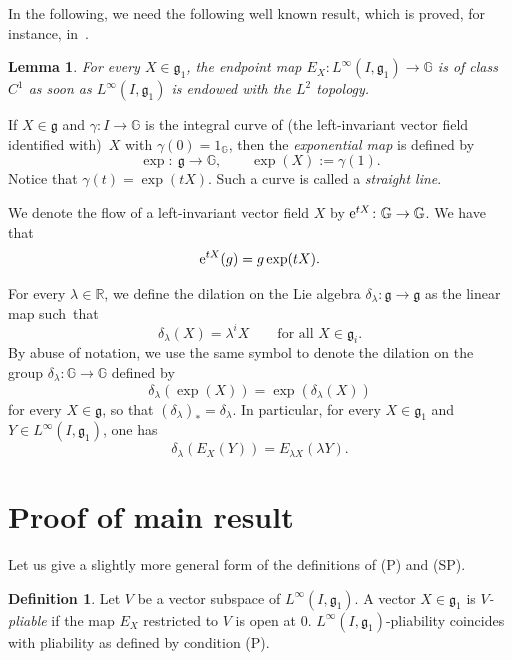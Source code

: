 \documentclass[10pt,a4paper]{amsart}
\numberwithin{equation}{section}
\newtheorem{Lemma}[Theorem]{Lemma}
\theoremstyle{definition}
\newtheorem{Definition}[Theorem]{Definition}
\begin{document}
In the following, we need the following well known result, which is proved, for instance, in~\cite[Section~8]{ABB20}.

\begin{Lemma}
 For every $X\in{\mathfrak g}_1$, the endpoint map $E_X\colon L^\infty(I,{\mathfrak g}_1)\to\mathbb{G}$ is of class $C^1$ as soon as $L^\infty(I,{\mathfrak g}_1)$ is endowed with the $L^2$ topology.
\end{Lemma}

If $X\in{\mathfrak g}$ and $\gamma\colon I \to\mathbb{G}$ is the integral curve of (the left-invariant vector field identified with)~$X$ with $\gamma(0)=1_\mathbb{G}$, then the {\em exponential map} is defined by
\begin{equation*}
 \exp\colon\ {\mathfrak g}\to\mathbb{G}, \qquad \exp(X):=\gamma(1).
\end{equation*}
Notice that $\gamma(t)=\exp(tX)$. Such a curve is called a {\em straight line}.

We denote the flow of a left-invariant vector field $X$ by ${\rm e}^{tX}\colon \mathbb{G}\to\mathbb{G}$. We have that
\[
{\rm e}^{tX}(g)=g\exp(tX).
\]

For every $\lambda\in\mathbb{R}$, we define the dilation on the Lie algebra $\delta_\lambda\colon {\mathfrak g}\to{\mathfrak g}$ as the linear map such~that
\[
 \delta_\lambda(X)=\lambda^i X \qquad \text{for all } X\in{\mathfrak g}_i.
\]
By abuse of notation, we use the same symbol to denote the dilation on the group $\delta_\lambda\colon \mathbb{G} \to \mathbb{G}$ defined by
\begin{equation}\label{eq:dilations-flow}
\delta_\lambda (\exp(X)) = \exp (\delta_\lambda(X))
\end{equation}
for every $X \in {\mathfrak g}$, so that $(\delta_\lambda)_* = \delta_\lambda$. In particular,
for
every $X \in {\mathfrak g}_1$ and $Y \in L^\infty(I,{\mathfrak g}_1)$, one has
\begin{equation}
\label{eq:dilations-flow2}
\delta_\lambda (E_X(Y)) = E_{\lambda X} (\lambda Y).
\end{equation}

\section{Proof of main result}\label{sec:proof}

Let us give a slightly more general form of the definitions of (P) and (SP).

\begin{Definition}\label{def:pl}
Let $V$ be a vector subspace of $L^\infty(I,{\mathfrak g}_1)$. A vector $X\in {\mathfrak g}_1$ is \emph{$V$-pliable} if the map $E_X$ restricted to $V$ is open at $0$.
$L^\infty(I,{\mathfrak g}_1)$-pliability coincides with pliability as defined by condition (P).
\end{Definition}
\end{document}

